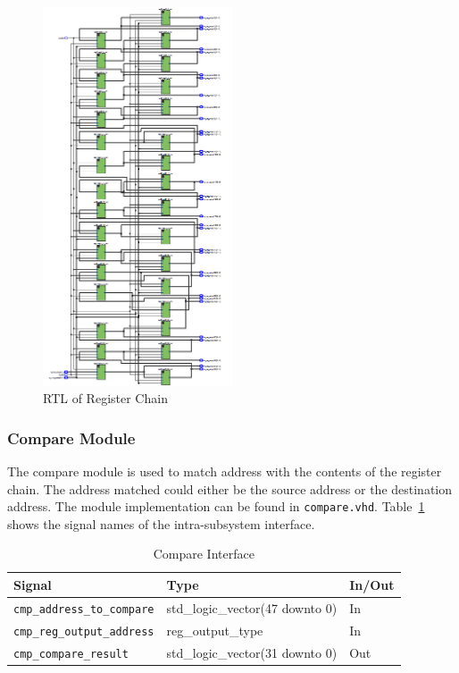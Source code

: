 \documentclass{article}
\begin{document}
\begin{figure}[ht!]
  \centering
  	\includegraphics[width=0.5\textwidth]{register_chain_rtl.PNG}
  \caption{RTL of Register Chain}
  \label{fig:regchain-rtl}
\end{figure}

\newpage
\subsubsection{Compare Module}

The compare module is used to match address with the contents of the register chain. The address matched could either be the source address or the destination address. The module implementation can be found in \texttt{compare.vhd}. Table~\ref{tab:compare} shows the signal names of the intra-subsystem interface. 


\begin{table}[ht]
    \begin{center}
        \begin{tabular}{lll}\hline
        Signal & Type & In/Out \\
        \hline
        \texttt{cmp\_address\_to\_compare} & std\_logic\_vector(47 downto 0) & In \\
        \hline
        \texttt{cmp\_reg\_output\_address} & reg\_output\_type & In \\
        \hline
        \texttt{cmp\_compare\_result} & std\_logic\_vector(31 downto 0) & Out \\
        \hline
        \end{tabular}
        \caption{Compare Interface}\label{tab:compare}
    \end{center}
\end{table}
\end{document}
